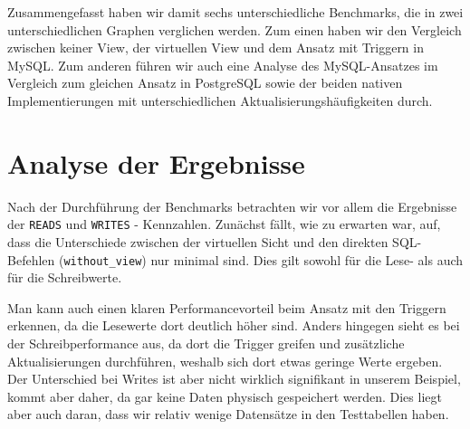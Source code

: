 Zusammengefasst haben wir damit sechs unterschiedliche Benchmarks, die in zwei unterschiedlichen Graphen verglichen werden.
Zum einen haben wir den Vergleich zwischen keiner View, der virtuellen View und dem Ansatz mit Triggern in MySQL\@.
Zum anderen führen wir auch eine Analyse des MySQL-Ansatzes im Vergleich zum gleichen Ansatz in PostgreSQL sowie der beiden nativen Implementierungen mit unterschiedlichen Aktualisierungshäufigkeiten durch.

\newpage
\section{Analyse der Ergebnisse}\label{sec:analyse-der-ergebnisse}

Nach der Durchführung der Benchmarks betrachten wir vor allem die Ergebnisse der \texttt{READS} und \texttt{WRITES} - Kennzahlen.
Zunächst fällt, wie zu erwarten war, auf, dass die Unterschiede zwischen der virtuellen Sicht und den direkten SQL-Befehlen (\texttt{without\_view}) nur minimal sind.
Dies gilt sowohl für die Lese- als auch für die Schreibwerte.

Man kann auch einen klaren Performancevorteil beim Ansatz mit den Triggern erkennen, da die Lesewerte dort deutlich höher sind.
Anders hingegen sieht es bei der Schreibperformance aus, da dort die Trigger greifen und zusätzliche Aktualisierungen durchführen, weshalb sich dort etwas geringe Werte ergeben.
Der Unterschied bei Writes ist aber nicht wirklich signifikant in unserem Beispiel, kommt aber daher, da gar keine Daten physisch gespeichert werden.
Dies liegt aber auch daran, dass wir relativ wenige Datensätze in den Testtabellen haben.

